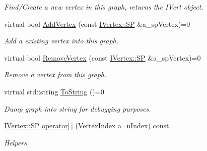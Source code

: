 \begin{DoxyCompactItemize}
\begin{DoxyCompactList}\small\item\em Find/\+Create a new vertex in this graph, returns the I\+Vert object. \end{DoxyCompactList}\item 
\mbox{\label{class_i_graph_a233c17f72916c4fad37329e082e75724}} 
virtual bool \hyperlink{class_i_graph_a233c17f72916c4fad37329e082e75724}{Add\+Vertex} (const \hyperlink{class_i_graph_1_1_i_vertex_af72b9df91f110bc7824c608c10cc819c}{I\+Vertex\+::\+SP} \&a\+\_\+sp\+Vertex)=0
\begin{DoxyCompactList}\small\item\em Add a existing vertex into this graph. \end{DoxyCompactList}\item 
\mbox{\label{class_i_graph_a550e07fceee6df75640a541fb0e1c2dc}} 
virtual bool \hyperlink{class_i_graph_a550e07fceee6df75640a541fb0e1c2dc}{Remove\+Vertex} (const \hyperlink{class_i_graph_1_1_i_vertex_af72b9df91f110bc7824c608c10cc819c}{I\+Vertex\+::\+SP} \&a\+\_\+sp\+Vertex)=0
\begin{DoxyCompactList}\small\item\em Remove a vertex from this graph. \end{DoxyCompactList}\item 
\mbox{\label{class_i_graph_ac5a9f5c68020250b2cd2a30ca85570e7}} 
virtual std\+::string \hyperlink{class_i_graph_ac5a9f5c68020250b2cd2a30ca85570e7}{To\+String} ()=0
\begin{DoxyCompactList}\small\item\em Dump graph into string for debugging purposes. \end{DoxyCompactList}\item 
\mbox{\label{class_i_graph_a5e775a60a7d460500c7a8d5a83a44bbe}} 
\hyperlink{class_i_graph_1_1_i_vertex_af72b9df91f110bc7824c608c10cc819c}{I\+Vertex\+::\+SP} \hyperlink{class_i_graph_a5e775a60a7d460500c7a8d5a83a44bbe}{operator\mbox{[}$\,$\mbox{]}} (Vertex\+Index a\+\_\+n\+Index) const
\begin{DoxyCompactList}\small\item\em Helpers. \end{DoxyCompactList}\item 
\mbox{\label{class_i_graph_ace3ff1d280935b56fce4e98ea440d511}} 

\end{DoxyCompactItemize}
